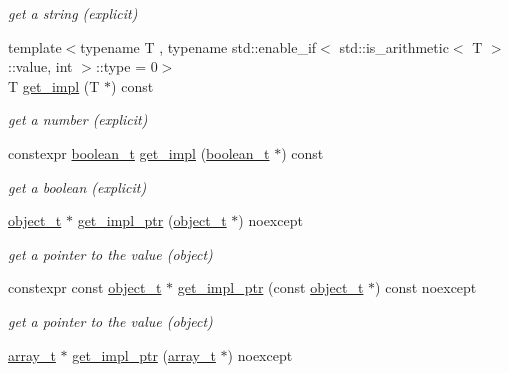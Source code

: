 \begin{DoxyCompactItemize}
\begin{DoxyCompactList}\small\item\em get a string (explicit) \end{DoxyCompactList}\item 
{\footnotesize template$<$typename T , typename std\+::enable\+\_\+if$<$                                                              std\+::is\+\_\+arithmetic$<$ T $>$\+::value, int $>$\+::type  = 0$>$ }\\T \hyperlink{classnlohmann_1_1basic__json_a87cb2949cc4e33885debfaa68780ec9b}{get\+\_\+impl} (T $\ast$) const 
\begin{DoxyCompactList}\small\item\em get a number (explicit) \end{DoxyCompactList}\item 
constexpr \hyperlink{classnlohmann_1_1basic__json_af3bc3e83aa162d7ba4df16a949872723}{boolean\+\_\+t} \hyperlink{classnlohmann_1_1basic__json_ac78dbecb963c08bc1448cd829d130f6c}{get\+\_\+impl} (\hyperlink{classnlohmann_1_1basic__json_af3bc3e83aa162d7ba4df16a949872723}{boolean\+\_\+t} $\ast$) const 
\begin{DoxyCompactList}\small\item\em get a boolean (explicit) \end{DoxyCompactList}\item 
\hyperlink{classnlohmann_1_1basic__json_a0ac9894c9de8dc551cf2e5f1c605537f}{object\+\_\+t} $\ast$ \hyperlink{classnlohmann_1_1basic__json_a5f75d46143bc6eb4d19faf0a1e168deb}{get\+\_\+impl\+\_\+ptr} (\hyperlink{classnlohmann_1_1basic__json_a0ac9894c9de8dc551cf2e5f1c605537f}{object\+\_\+t} $\ast$) noexcept
\begin{DoxyCompactList}\small\item\em get a pointer to the value (object) \end{DoxyCompactList}\item 
constexpr const \hyperlink{classnlohmann_1_1basic__json_a0ac9894c9de8dc551cf2e5f1c605537f}{object\+\_\+t} $\ast$ \hyperlink{classnlohmann_1_1basic__json_a16b373c9b62ce40eae1ad05786fd501f}{get\+\_\+impl\+\_\+ptr} (const \hyperlink{classnlohmann_1_1basic__json_a0ac9894c9de8dc551cf2e5f1c605537f}{object\+\_\+t} $\ast$) const  noexcept
\begin{DoxyCompactList}\small\item\em get a pointer to the value (object) \end{DoxyCompactList}\item 
\hyperlink{classnlohmann_1_1basic__json_ab00b882d39306d663c23dab110f5cae0}{array\+\_\+t} $\ast$ \hyperlink{classnlohmann_1_1basic__json_a938efb5baa975709ba2b24fe58eecb0e}{get\+\_\+impl\+\_\+ptr} (\hyperlink{classnlohmann_1_1basic__json_ab00b882d39306d663c23dab110f5cae0}{array\+\_\+t} $\ast$) noexcept

\end{DoxyCompactItemize}
